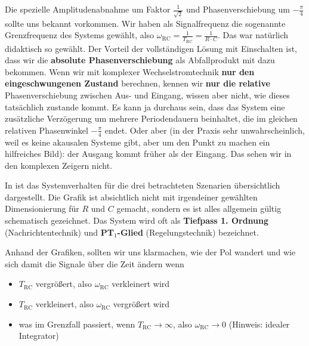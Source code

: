 \begin{Loesung}
\begin{itemize}
Die spezielle Amplitudenabnahme um Faktor $\frac{1}{\sqrt{2}}$ und Phasenverschiebung
um $-\frac{\pi}{4}$ sollte uns bekannt vorkommen. Wir haben als Signalfrequenz
die sogenannte Grenzfrequenz des Systems gewählt, also
$\omega_\mathrm{RC} = \frac{1}{T_\mathrm{RC}} = \frac{1}{R \cdot C}$.
Das war natürlich didaktisch so gewählt.
%
Der Vorteil der vollständigen Lösung mit Einschalten ist, dass wir
die \textbf{absolute Phasenverschiebung} als Abfallprodukt mit dazu bekommen.
%
Wenn wir mit komplexer Wechselstromtechnik \textbf{nur den eingeschwungenen Zustand}
berechnen, kennen wir \textbf{nur die relative} Phasenverschiebung
zwischen Aus- und Eingang, wissen aber nicht, wie dieses tatsächlich zustande kommt.
Es kann ja durchaus sein, dass das System eine zusätzliche Verzögerung
um mehrere Periodendauern beinhaltet,
die im gleichen relativen Phasenwinkel $-\frac{\pi}{4}$ endet.
Oder aber (in der Praxis sehr
unwahrscheinlich, weil es keine akausalen Systeme gibt, aber um den Punkt zu machen
ein hilfreiches Bild): der Ausgang kommt früher als der Eingang.
Das sehen wir in den komplexen Zeigern nicht.

In  ist das Systemverhalten für die drei betrachteten Szenarien
übersichtlich dargestellt.
%
Die Grafik ist absichtlich nicht mit irgendeiner gewählten Dimensionierung
für $R$ und $C$ gemacht, sondern es ist alles allgemein gültig schematisch gezeichnet.
Das System wird oft als \textbf{Tiefpass 1. Ordnung} (Nachrichtentechnik) und
\textbf{PT$_1$-Glied} (Regelungstechnik) bezeichnet.

Anhand der Grafiken, sollten wir uns klarmachen, wie der Pol wandert und
wie sich damit die Signale über die Zeit ändern
wenn
\begin{itemize}
  \item $T_\mathrm{RC}$ vergrößert, also $\omega_\mathrm{RC}$ verkleinert wird
  \item $T_\mathrm{RC}$ verkleinert, also $\omega_\mathrm{RC}$ vergrößert wird
  \item was im Grenzfall passiert, wenn $T_\mathrm{RC}\to\infty$, also
  $\omega_\mathrm{RC}\to 0$ (Hinweis: idealer Integrator)
\end{itemize}



\end{itemize}
\end{Loesung}
